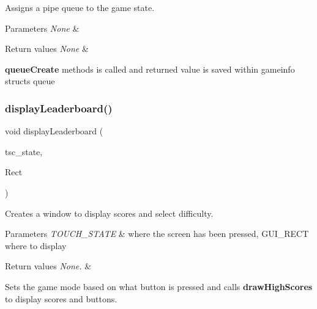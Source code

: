 Assigns a pipe queue to the game state. 


\begin{DoxyParams}{Parameters}
{\em None} & \\
\hline
\end{DoxyParams}

\begin{DoxyRetVals}{Return values}
{\em None} & \\
\hline
\end{DoxyRetVals}
{\bfseries queue\+Create} methods is called and returned value is saved within gameinfo structs queue \mbox{\label{group___flappy___bird_gabfcc5324c3f7bb7ce59a6e462a1ebd42}} 
\subsubsection{\texorpdfstring{display\+Leaderboard()}{displayLeaderboard()}}
{\footnotesize\ttfamily void display\+Leaderboard (\begin{DoxyParamCaption}\item[{T\+O\+U\+C\+H\+\_\+\+S\+T\+A\+TE}]{tsc\+\_\+state,  }\item[{G\+U\+I\+\_\+\+R\+E\+CT}]{Rect }\end{DoxyParamCaption})}



Creates a window to display scores and select difficulty. 


\begin{DoxyParams}{Parameters}
{\em T\+O\+U\+C\+H\+\_\+\+S\+T\+A\+TE} & where the screen has been pressed, G\+U\+I\+\_\+\+R\+E\+CT where to display \\
\hline
\end{DoxyParams}

\begin{DoxyRetVals}{Return values}
{\em None.} & \\
\hline
\end{DoxyRetVals}
Sets the game mode based on what button is pressed and calls {\bfseries draw\+High\+Scores} to display scores and buttons. \mbox{\label{group___flappy___bird_ga9190fcf2aa0aeea553dcad1bdd5a4a46}} 
